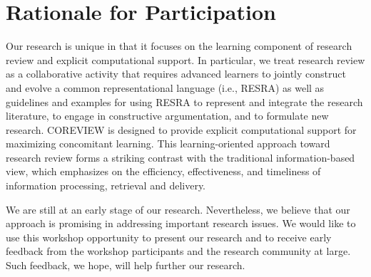 \section{Rationale for Participation}

Our research is unique in that it focuses on the learning component of
research review and explicit computational support. In particular, we treat
research review as a collaborative activity that requires advanced learners
to jointly construct and evolve a common representational language (i.e.,
RESRA) as well as guidelines and examples for using RESRA to represent and
integrate the research literature, to engage in constructive argumentation,
and to formulate new research. COREVIEW is designed to provide explicit
computational support for maximizing concomitant learning. This
learning-oriented approach toward research review forms a striking contrast
with the traditional information-based view, which emphasizes on the
efficiency, effectiveness, and timeliness of information processing,
retrieval and delivery.

We are still at an early stage of our research. Nevertheless, we believe
that our approach is promising in addressing important research issues. We
would like to use this workshop opportunity to present our research and to
receive early feedback from the workshop participants and the research
community at large. Such feedback, we hope, will help further our research.








